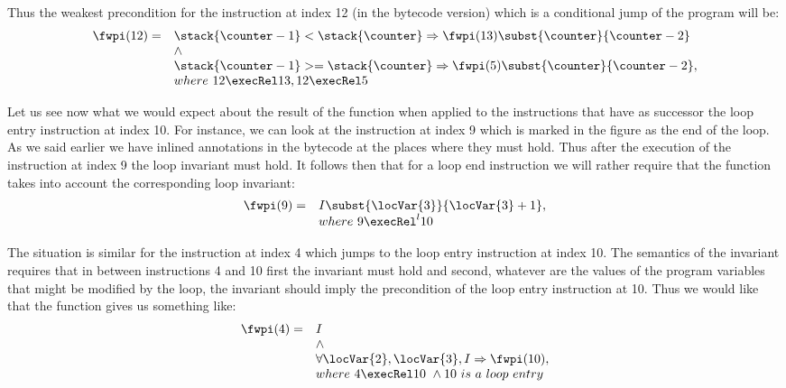 Thus the weakest precondition for the instruction at index 12 (in the bytecode version) which is a conditional jump  
of the program will be:
$$ \begin{array}{ll} \fwpi( 12 )  = & 
                      \stack{\counter - 1} < \stack{\counter} \Rightarrow   \fwpi(13) \subst{\counter}{\counter - 2} \\
                      &\wedge \\
		      &\stack{\counter - 1} >= \stack{\counter} \Rightarrow   \fwpi(5)\subst{\counter}{\counter - 2}, \\
		      & where \ 12 \execRel 13, 12 \execRel 5
   \end{array}
		      $$

Let us see now what  we would expect about the result of   the function \fwpi{} when applied to the instructions
that have as successor the loop entry instruction at index 10. For instance, we can look at the instruction
at index 9 which is marked in the figure as the end of the loop. 
As we said earlier we have inlined annotations in the bytecode at the places where they must hold. Thus after the execution
of the instruction at index 9  the loop invariant must hold. It follows then that for a loop end instruction 
we will rather require that the \fwpi{} function takes into account the corresponding loop invariant:
$$ \begin{array}{ll} \fwpi( 9 )  = &
                    I \subst{\locVar{3}}{\locVar{3} + 1}, \\
		     & where \ 9 \execRel^l 10 
		     \end{array}$$


The situation is  similar  for the instruction at index 4 which jumps to the loop entry instruction at index 10. 
The semantics of the invariant requires that  in between instructions 4 and 10 first the invariant must hold
and second,  whatever are the values
of the program variables that might be modified by the loop, the invariant should imply the precondition of the loop entry instruction at 10.
 Thus we would like that  the function \fwpi{} gives us something like: 
   $$\begin{array}{ll} \fwpi( 4 ) =& 
                    I \\
		    &\wedge \\
		    &\forall \locVar{2}, \locVar{3},  I  \Rightarrow \fwpi(10), \\
			&    where \ 4 \execRel 10 \ \wedge 10 \ is \ a \ loop \ entry   
      \end{array}
                 $$

